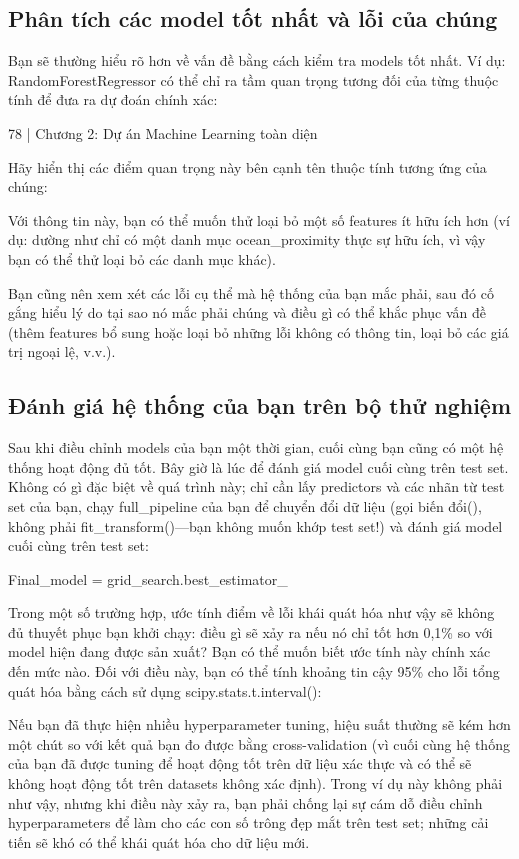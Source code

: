 \subsection{Phân tích các model tốt nhất và lỗi của chúng}

Bạn sẽ thường hiểu rõ hơn về vấn đề bằng cách kiểm tra models tốt nhất. Ví dụ: RandomForestRegressor có thể chỉ ra tầm quan trọng tương đối của từng thuộc tính để đưa ra dự đoán chính xác:

78 | Chương 2: Dự án Machine Learning toàn diện

Hãy hiển thị các điểm quan trọng này bên cạnh tên thuộc tính tương ứng của chúng:

Với thông tin này, bạn có thể muốn thử loại bỏ một số features ít hữu ích hơn (ví dụ: dường như chỉ có một danh mục ocean\_proximity thực sự hữu ích, vì vậy bạn có thể thử loại bỏ các danh mục khác).

Bạn cũng nên xem xét các lỗi cụ thể mà hệ thống của bạn mắc phải, sau đó cố gắng hiểu lý do tại sao nó mắc phải chúng và điều gì có thể khắc phục vấn đề (thêm features bổ sung hoặc loại bỏ những lỗi không có thông tin, loại bỏ các giá trị ngoại lệ, v.v.).

\subsection{Đánh giá hệ thống của bạn trên bộ thử nghiệm}

Sau khi điều chỉnh models của bạn một thời gian, cuối cùng bạn cũng có một hệ thống hoạt động đủ tốt. Bây giờ là lúc để đánh giá model cuối cùng trên test set. Không có gì đặc biệt về quá trình này; chỉ cần lấy predictors và các nhãn từ test set của bạn, chạy full\_pipeline của bạn để chuyển đổi dữ liệu (gọi biến đổi(), không phải fit\_transform()—bạn không muốn khớp test set!) và đánh giá model cuối cùng trên test set:

Final\_model = grid\_search.best\_estimator\_

Trong một số trường hợp, ước tính điểm về lỗi khái quát hóa như vậy sẽ không đủ thuyết phục bạn khởi chạy: điều gì sẽ xảy ra nếu nó chỉ tốt hơn 0,1\% so với model hiện đang được sản xuất? Bạn có thể muốn biết ước tính này chính xác đến mức nào. Đối với điều này, bạn có thể tính khoảng tin cậy 95\% cho lỗi tổng quát hóa bằng cách sử dụng scipy.stats.t.interval():

Nếu bạn đã thực hiện nhiều hyperparameter tuning, hiệu suất thường sẽ kém hơn một chút so với kết quả bạn đo được bằng cross-validation (vì cuối cùng hệ thống của bạn đã được tuning để hoạt động tốt trên dữ liệu xác thực và có thể sẽ không hoạt động tốt trên datasets không xác định). Trong ví dụ này không phải như vậy, nhưng khi điều này xảy ra, bạn phải chống lại sự cám dỗ điều chỉnh hyperparameters để làm cho các con số trông đẹp mắt trên test set; những cải tiến sẽ khó có thể khái quát hóa cho dữ liệu mới.

